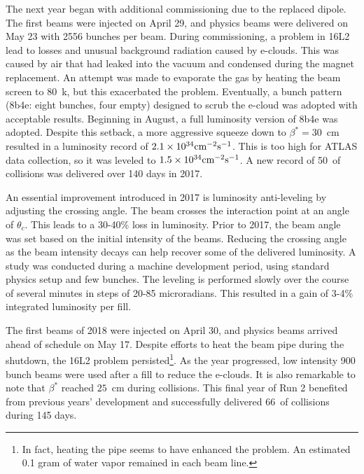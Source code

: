 The next year began with additional commissioning due to the replaced dipole.
The first beams were injected on April 29, and physics beams were delivered on May 23 with 2556 bunches per beam.
During commissioning, a problem in 16L2 lead to losses and unusual background radiation caused by e-clouds.
This was caused by air that had leaked into the vacuum and condensed during the magnet replacement.
An attempt was made to evaporate the gas by heating the beam screen to 80~k, but this exacerbated the problem.
Eventually, a bunch pattern (8b4e: eight bunches, four empty) designed to scrub the e-cloud was adopted with acceptable results.
Beginning in August, a full luminosity version of 8b4e was adopted.\cite{lhcRun2}
Despite this setback, a more aggressive squeeze down to $\beta^*=30$~cm resulted in a luminosity record of $2.1\times10^{34}\text{cm}^{-2}\text{s}^{-1}$.
This is too high for ATLAS data collection, so it was leveled to $1.5\times10^{34}\text{cm}^{-2}\text{s}^{-1}$.
A new record of 50~\fb of collisions was delivered over 140 days in 2017.\cite{lhcRun2}

An essential improvement introduced in 2017 is luminosity anti-leveling by adjusting the crossing angle.
The beam crosses the interaction point at an angle of $\theta_c$.
This leads to a 30-40\% loss in luminosity. \cite{gorzawski}
Prior to 2017, the beam angle was set based on the initial intensity of the beams. \cite{gorzawski}
Reducing the crossing angle as the beam intensity decays can help recover some of the delivered luminosity.
A study was conducted during a machine development period, using standard physics setup and few bunches. \cite{gorzawski}
The leveling is performed slowly over the course of several minutes in steps of 20-85 microradians.
This resulted in a gain of 3-4\% integrated luminosity per fill.

The first beams of 2018 were injected on April 30, and physics beams arrived ahead of schedule on May 17.
Despite efforts to heat the beam pipe during the shutdown, the 16L2 problem persisted\footnote{In fact, heating the pipe seems to have enhanced the problem. An estimated 0.1 gram of water vapor remained in each beam line.}.
As the year progressed, low intensity 900 bunch beams were used after a fill to reduce the e-clouds.
It is also remarkable to note that $\beta^*$ reached $25$~cm during collisions.
This final year of Run 2 benefited from previous years' development and successfully delivered 66~\fb of collisions during 145 days.


